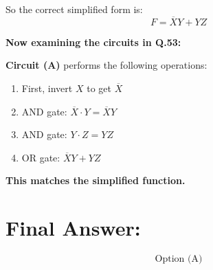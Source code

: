 \documentclass[a4paper,12pt]{article}
\begin{document}
So the correct simplified form is:
\[
\boxed{F = \overline{X} Y + Y Z}
\]

\textbf{Now examining the circuits in Q.53:}

\textbf{Circuit (A)} performs the following operations:
\begin{enumerate}
    \item First, invert \( X \) to get \( \overline{X} \)
    \item AND gate: \( \overline{X} \cdot Y = \overline{X} Y \)
    \item AND gate: \( Y \cdot Z = Y Z \)
    \item OR gate: \( \overline{X} Y + Y Z \)
\end{enumerate}
\textbf{This matches the simplified function.}

\section*{Final Answer:}
\[
\boxed{\text{Option (A)}}
\]
\end{document}
